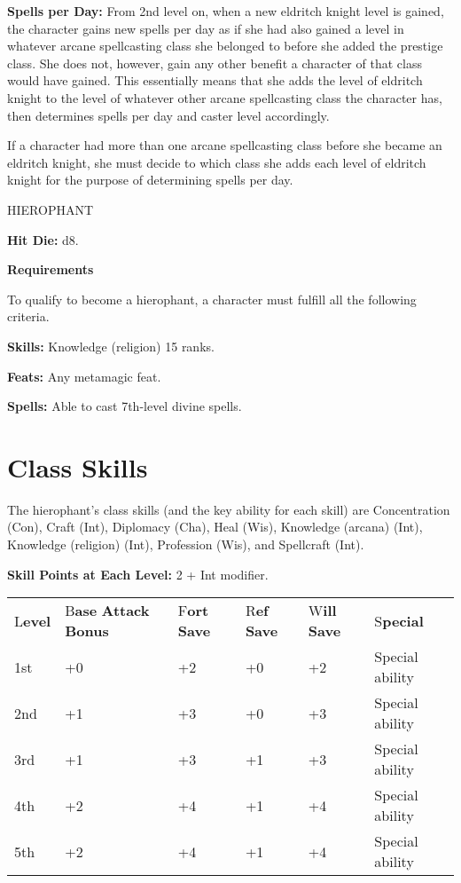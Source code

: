 \documentclass{article}
\begin{document}
\textbf{Spells per Day:} From 2nd level on, when a new eldritch knight level is 
gained, the character gains new spells per day as if she had also gained a level 
in whatever arcane spellcasting class she belonged to before she added the prestige 
class. She does not, however, gain any other benefit a character of that class 
would have gained. This essentially means that she adds the level of eldritch knight 
to the level of whatever other arcane spellcasting class the character has, then 
determines spells per day and caster level accordingly.

If a character had more than one arcane spellcasting class before she became an 
eldritch knight, she must decide to which class she adds each level of eldritch 
knight for the purpose of determining spells per day.

\vspace{12pt}
HIEROPHANT

\textbf{Hit Die:} d8.

\textbf{Requirements}

To qualify to become a hierophant, a character must fulfill all the following criteria.

\textbf{Skills:} Knowledge (religion) 15 ranks.

\textbf{Feats:} Any metamagic feat.

\textbf{Spells:} Able to cast 7th-level divine spells.

\section*{\textbf{Class Skills}}

The hierophant's class skills (and the key ability for each skill) are Concentration 
(Con), Craft (Int), Diplomacy (Cha), Heal (Wis), Knowledge (arcana) (Int), Knowledge 
(religion) (Int), Profession (Wis), and Spellcraft (Int).  

\parindent=3pt
\textbf{Skill Points at Each Level:} 2 + Int modifier.

\vspace{12pt}
\parindent=0pt
\begin{tabular}{|>{\raggedright}p{29pt}|>{\raggedright}p{33pt}|>{\raggedright}p{23pt}|>{\raggedright}p{23pt}|>{\raggedright}p{23pt}|>{\raggedright}p{60pt}|}
\hline
\multicolumn{6}{|p{192pt}|}{T\textbf{able: The Hierophant}}\tabularnewline
\hline
L\textbf{evel } & B\textbf{ase}\linebreak{}
\textbf{Attack}\linebreak{}
\textbf{Bonus} & F\textbf{ort}\linebreak{}
\textbf{Save} & R\textbf{ef}\linebreak{}
\textbf{Save} & W\textbf{ill}\linebreak{}
\textbf{Save} & S\textbf{pecial}\tabularnewline
\hline
1st & +0 & +2 & +0 & +2 & Special ability\tabularnewline
\hline
2nd & +1 & +3 & +0 & +3 & Special ability\tabularnewline
\hline
3rd & +1 & +3 & +1 & +3 & Special ability\tabularnewline
\hline
4th & +2 & +4 & +1 & +4 & Special ability\tabularnewline
\hline
5th & +2 & +4 & +1 & +4 & Special ability\tabularnewline
\hline
\end{tabular}
\end{document}
